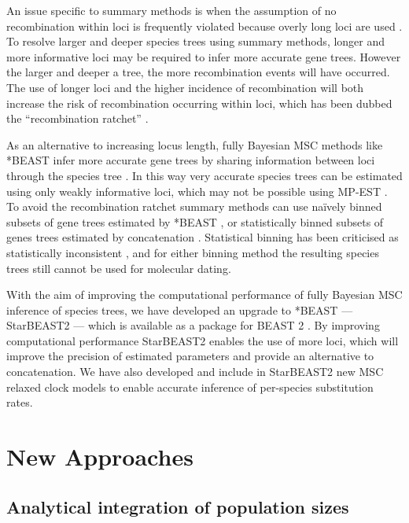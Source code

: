 \documentclass[nogrid]{MBE}%
\begin{document}
An issue specific to summary methods is when the assumption of
no recombination within loci is frequently violated because overly long loci are used \citep{Gatesy26032013}. To
resolve larger and deeper species trees using summary methods, longer and more
informative loci may be required to infer more accurate gene trees. However
the larger and deeper a tree, the more recombination events will have occurred.
The use of longer loci and the higher incidence of recombination will both
increase the risk of recombination occurring within loci, which has been dubbed
the ``recombination ratchet'' \citep{Springer20161}.

As an alternative to increasing locus length, fully Bayesian MSC methods like
*BEAST infer more accurate gene trees by sharing information between loci
through the species tree \citep{Szollosi01012015}. In this way very accurate
species trees can be estimated using only weakly informative loci, which may
not be possible using MP-EST \citep{Xu1353}. To avoid the recombination
ratchet summary methods can use na\"ively binned subsets of gene trees
estimated by *BEAST \citep{Zimmermann2014}, or statistically binned subsets of
genes trees estimated by concatenation \citep{Mirarab1250463}. Statistical
binning has been criticised as statistically inconsistent
\citep{Liu171}, and for either binning method the resulting species trees
still cannot be used for molecular dating.

With the aim of improving the computational performance of fully Bayesian MSC
inference of species trees, we have developed an upgrade to *BEAST ---
StarBEAST2 --- which is available as a package for BEAST 2
\citep{10.1371/journal.pcbi.1003537}. By improving computational performance
StarBEAST2 enables the use of more loci, which will improve the
precision of estimated parameters and provide an alternative to concatenation.
We have also developed and include in StarBEAST2 new MSC relaxed clock models
to enable accurate inference of per-species substitution rates.

\section{New Approaches}

\subsection{Analytical integration of population sizes}
\end{document}
